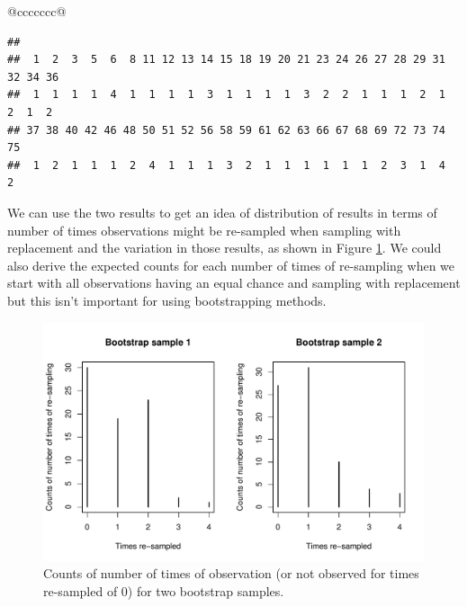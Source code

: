\documentclass[]{book}
\newenvironment{Shaded}{\begin{snugshade}}{\end{snugshade}}
\newcommand{\KeywordTok}[1]{\textcolor[rgb]{0.13,0.29,0.53}{\textbf{#1}}}
\newcommand{\StringTok}[1]{\textcolor[rgb]{0.31,0.60,0.02}{#1}}
\newcommand{\OperatorTok}[1]{\textcolor[rgb]{0.81,0.36,0.00}{\textbf{#1}}}
\newcommand{\NormalTok}[1]{#1}
\theoremstyle{definition}
\theoremstyle{definition}
\theoremstyle{remark}
\begin{document}
\begin{longtable}[]{@{}ccccccc@{}}
\begin{minipage}[b]{0.10\columnwidth}
\begin{Shaded}
\begin{Highlighting}[]
\begin{Shaded}
\begin{Highlighting}[]
\begin{enumerate}
\begin{Shaded}
\end{Shaded}

\begin{verbatim}
## 
##  1  2  3  5  6  8 11 12 13 14 15 18 19 20 21 23 24 26 27 28 29 31 32 34 36 
##  1  1  1  1  4  1  1  1  1  3  1  1  1  1  3  2  2  1  1  1  2  1  2  1  2 
## 37 38 40 42 46 48 50 51 52 56 58 59 61 62 63 66 67 68 69 72 73 74 75 
##  1  2  1  1  1  2  4  1  1  1  3  2  1  1  1  1  1  1  2  3  1  4  2
\end{verbatim}

We can use the two results to get an idea of distribution of results in
terms of number of times observations might be re-sampled when sampling
with replacement and the variation in those results, as shown in Figure
\ref{fig:Figure2-17}. We could also derive the expected counts for each
number of times of re-sampling when we start with all observations
having an equal chance and sampling with replacement but this isn't
important for using bootstrapping methods.




\begin{figure}
\centering
\includegraphics{02-reintroductionToStatistics_files/figure-latex/Figure2-17-1.pdf}
\caption{\label{fig:Figure2-17}Counts of number of times of observation (or not observed
for times re-sampled of 0) for two bootstrap samples.}
\end{figure}


\end{enumerate}
\end{Highlighting}
\end{Shaded}
\end{Highlighting}
\end{Shaded}
\end{minipage}
\end{longtable}
\end{document}
